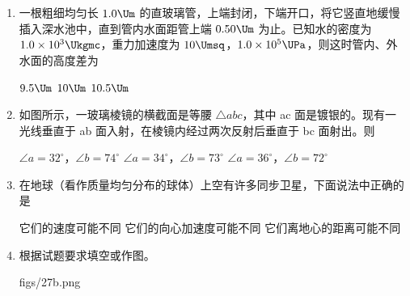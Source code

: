 \documentclass[\gkver]{gaokaozhenti}
\begin{document}
\begin{enumerate}
\item
一根粗细均匀长 $1.0\Um$ 的直玻璃管，上端封闭，下端开口，将它竖直地缓慢插入深水池中，直到管内水面距管上端 $0.50\Um$ 为止。已知水的密度为 $1.0\times10^{3}\Ukgmc$，重力加速度为 $10\Umsq$，$1.0\times10^{5}\UPa$，则这时管内、外水面的高度差为

\fourchoices[answer=C]
{$9\Um$}
{$9.5\Um$}
{$10\Um$}
{$10.5\Um$}


\item
如图所示，一玻璃棱镜的横截面是等腰 $\triangle abc$，其中 ac 面是镀银的。现有一光线垂直于 ab 面入射，在棱镜内经过两次反射后垂直于 bc 面射出。则


{$\angle a=32^{\circ}$，$\angle b=74^{\circ}$}
{$\angle a=34^{\circ}$，$\angle b=73^{\circ}$}
{$\angle a=36^{\circ}$，$\angle b=72^{\circ}$}


\item
在地球（看作质量均匀分布的球体）上空有许多同步卫星，下面说法中正确的是

{它们的速度可能不同}
{它们的向心加速度可能不同}
{它们离地心的距离可能不同}


\item
根据试题要求填空或作图。

{figs/27b.png}


\end{enumerate}
\end{document}
